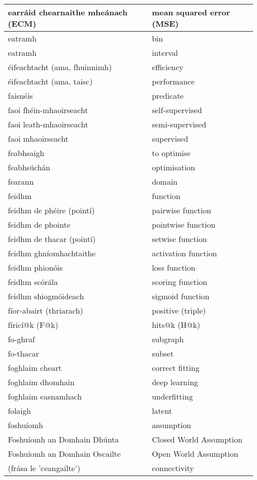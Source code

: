 \begin{longtable}{|l|l|}
		earráid chearnaithe mheánach (ECM)&mean squared error (MSE)\\ \hline 
		eatramh&bin\\ \hline 
		eatramh&interval\\ \hline 
		éifeachtacht (ama, fhuinnimh)&efficiency\\ \hline 
		éifeachtacht (ama, taisc)&performance\\ \hline 
		faisnéis&predicate\\ \hline 
		faoi fhéin-mhaoirseacht&self-supervised\\ \hline 
		faoi leath-mhaoirseacht&semi-supervised\\ \hline 
		faoi mhaoirseacht&supervised\\ \hline 
		feabhsaigh&to optimise\\ \hline 
		feabhsúchán&optimisation\\ \hline 
		fearann&domain\\ \hline 
		feidhm&function\\ \hline 
		feidhm de phéire (pointí)&pairwise function\\ \hline 
		feidhm de phointe&pointwise function\\ \hline 
		feidhm de thacar (pointí)&setwise function\\ \hline 
		feidhm ghníomhachtaithe&activation function\\ \hline 
		feidhm phionóis&loss function\\ \hline 
		feidhm scórála&scoring function\\ \hline 
		feidhm shiogmóideach&sigmoid function\\ \hline 
		fíor-abairt (thriarach)&positive (triple)\\ \hline 
		fíricí@k (F@k)&hits@k (H@k)\\ \hline 
		fo-ghraf&subgraph\\ \hline 
		fo-thacar&subset\\ \hline 
		foghlaim cheart&correct fitting\\ \hline 
		foghlaim dhomhain&deep learning\\ \hline 
		foghlaim easnamhach&underfitting\\ \hline 
		folaigh&latent\\ \hline 
		foshuíomh&assumption\\ \hline 
		Foshuíomh an Domhain Dhúnta&Closed World Assumption\\ \hline 
		Foshuíomh an Domhain Oscailte&Open World Assumption\\ \hline 
		(frása le 'ceangailte')&connectivity\\ \hline 

\end{longtable}
